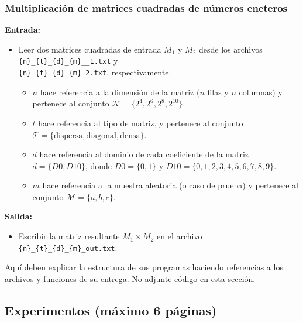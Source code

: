 \subsubsection{Multiplicación de matrices cuadradas de números eneteros}

\textbf{Entrada:}
\begin{itemize}
    \item Leer dos matrices cuadradas de entrada $M_1$ y $M_2$ desde los archivos \texttt{\{n\}\_\{t\}\_\{d\}\_\{m\}\_\_1.txt} y \\ 
    \texttt{\{n\}\_\{t\}\_\{d\}\_\{m\}\_2.txt}, respectivamente.
    \begin{itemize}
        \item $n$ hace referencia a la dimensión de la matriz ($n$ filas y $n$ columnas) y pertenece al conjunto $\mathcal{N} = \{2^4, 2^6, 2^8, 2^{10}\}$.
        \item $t$ hace referencia al tipo de matriz, y pertenece al conjunto $\mathcal{T} = \{ \text{dispersa}, \text{diagonal}, \text{densa} \}$.
        \item $d$ hace referencia al dominio de cada coeficiente de la matriz $d = \{D0, D10\}$, donde $D0 = \{0,1\}$ y $D10 = \{0,1,2,3,4,5,6,7,8,9\}$. 
        \item $m$ hace referencia a la muestra aleatoria (o caso de prueba) y pertenece al conjunto $\mathcal{M} = \{a,b,c\}$.
    \end{itemize}
\end{itemize}

\textbf{Salida:}
\begin{itemize}
    \item Escribir la matriz resultante $M_1 \times M_2$ en el archivo \texttt{\{n\}\_\{t\}\_\{d\}\_\{m\}\_out.txt}.
\end{itemize}

Aquí deben explicar la estructura de sus programas haciendo referencias a los archivos y funciones de su entrega. No adjunte código en esta sección.

\subsection{Experimentos (máximo 6 páginas)}



